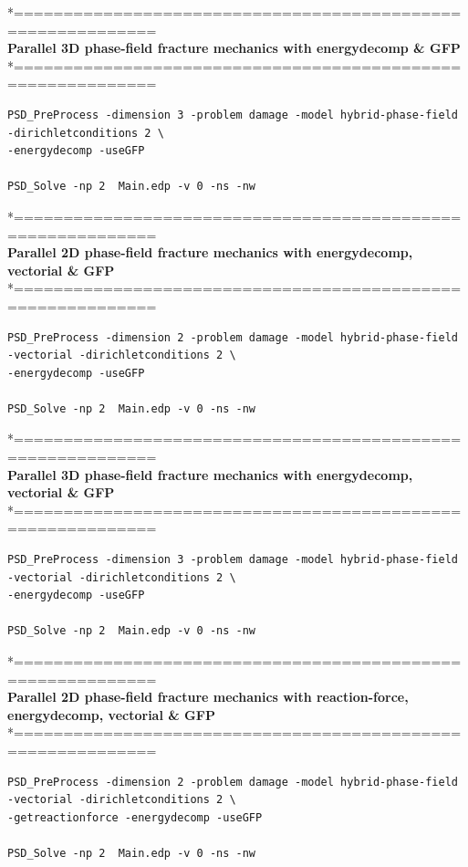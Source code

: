 *============================================================\\
\textbf{ Parallel 3D phase-field fracture mechanics with energydecomp \& GFP} \\
*============================================================\\
\begin{lstlisting}[style=BashInputStyle]
PSD_PreProcess -dimension 3 -problem damage -model hybrid-phase-field -dirichletconditions 2 \
-energydecomp -useGFP   

PSD_Solve -np 2  Main.edp -v 0 -ns -nw   	
\end{lstlisting}
*============================================================\\
 \textbf{Parallel 2D phase-field fracture mechanics with energydecomp, vectorial \& GFP} \\
*============================================================\\
\begin{lstlisting}[style=BashInputStyle]
PSD_PreProcess -dimension 2 -problem damage -model hybrid-phase-field -vectorial -dirichletconditions 2 \
-energydecomp -useGFP  

PSD_Solve -np 2  Main.edp -v 0 -ns -nw   
\end{lstlisting}
*============================================================\\
\textbf{ Parallel 3D phase-field fracture mechanics with energydecomp, vectorial \& GFP} \\
*============================================================\\
\begin{lstlisting}[style=BashInputStyle]
PSD_PreProcess -dimension 3 -problem damage -model hybrid-phase-field -vectorial -dirichletconditions 2 \
-energydecomp -useGFP   

PSD_Solve -np 2  Main.edp -v 0 -ns -nw   	
\end{lstlisting}
*============================================================\\
 \textbf{Parallel 2D phase-field fracture mechanics with reaction-force, energydecomp, vectorial \& GFP} \\
*============================================================\\
\begin{lstlisting}[style=BashInputStyle]
PSD_PreProcess -dimension 2 -problem damage -model hybrid-phase-field -vectorial -dirichletconditions 2 \
-getreactionforce -energydecomp -useGFP  

PSD_Solve -np 2  Main.edp -v 0 -ns -nw   
\end{lstlisting}
